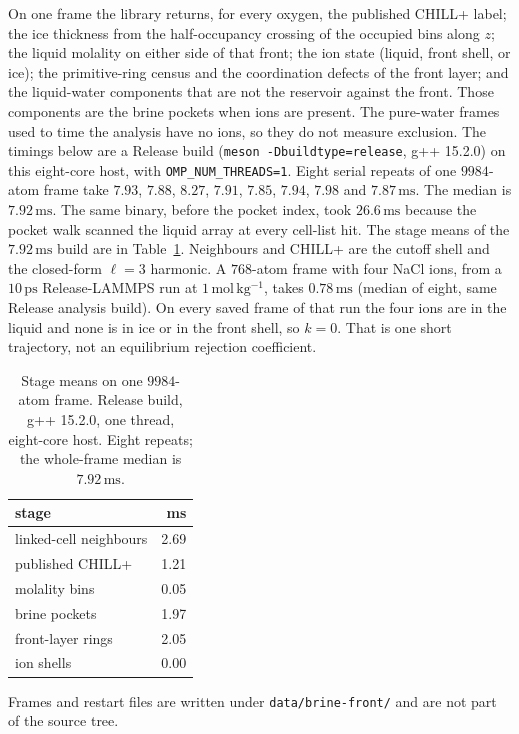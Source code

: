 On one frame the library returns, for every oxygen, the published
CHILL+ label; the ice thickness from the half-occupancy crossing of
the occupied bins along $z$; the liquid molality on either side of
that front; the ion state (liquid, front shell, or ice); the
primitive-ring census and the coordination defects of the front
layer; and the liquid-water components that are not the reservoir
against the front.
Those components are the brine pockets when ions are present.
The pure-water frames used to time the analysis have no ions, so
they do not measure exclusion.
The timings below are a Release build
(\texttt{meson -Dbuildtype=release}, g++ 15.2.0) on this eight-core
host, with \texttt{OMP\_NUM\_THREADS=1}.
Eight serial repeats of one $9984$-atom frame take
$7.93$, $7.88$, $8.27$, $7.91$, $7.85$, $7.94$, $7.98$ and
$7.87\,\mathrm{ms}$.
The median is $7.92\,\mathrm{ms}$.
The same binary, before the pocket index, took $26.6\,\mathrm{ms}$
because the pocket walk scanned the liquid array at every cell-list hit.
The stage means of the $7.92\,\mathrm{ms}$ build are in
Table~\ref{tab:brine-stage}.
Neighbours and CHILL+ are the cutoff shell and the closed-form
$\ell=3$ harmonic.
A $768$-atom frame with four NaCl ions, from a $10\,\mathrm{ps}$
Release-LAMMPS run at $1\,\mathrm{mol\,kg^{-1}}$, takes $0.78\,\mathrm{ms}$
(median of eight, same Release analysis build).
On every saved frame of that run the four ions are in the liquid
and none is in ice or in the front shell, so $k=0$.
That is one short trajectory, not an equilibrium rejection coefficient.

\begin{table}[t]
\centering
\caption{Stage means on one $9984$-atom frame.
Release build, g++ 15.2.0, one thread, eight-core host.
Eight repeats; the whole-frame median is $7.92\,\mathrm{ms}$.}
\label{tab:brine-stage}
\begin{tabular}{lr}
\hline
stage & ms \\
\hline
linked-cell neighbours & 2.69 \\
published CHILL+ & 1.21 \\
molality bins & 0.05 \\
brine pockets & 1.97 \\
front-layer rings & 2.05 \\
ion shells & 0.00 \\
\hline
\end{tabular}
\end{table}
Frames and restart files are written under \texttt{data/brine-front/}
and are not part of the source tree.

